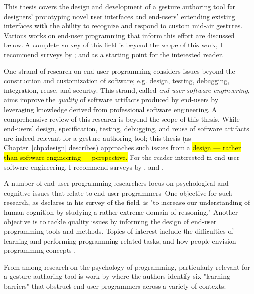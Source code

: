 This thesis covers the design and development of a gesture authoring tool for designers' prototyping novel user interfaces and end-users' extending existing interfaces with the ability to recognize and respond to custom mid-air gestures. Various works on end-user programming that inform this effort are discussed below. A complete survey of this field is beyond the scope of this work; I recommend surveys by \textcite{Paterno:2013}; and \textcite{Myers:2006} as a starting point for the interested reader.

One strand of research on end-user programming considers issues beyond the construction and customization of software; e.g. design, testing, debugging, integration, reuse, and security. This strand, called \emph{end-user software engineering}, aims improve the \emph{quality} of software artifacts produced by end-users by leveraging knowledge derived from professional software engineering. A comprehensive review of this research is beyond the scope of this thesis. While end-users' design, specification, testing, debugging, and reuse of software artifacts are indeed relevant for a gesture authoring tool; this thesis  (as Chapter~\ref{chp:design} describes) approaches such issues from a \hl{design --- rather than software engineering --- perspective.} For the reader interested in end-user software engineering, I recommend surveys by \textcite{Burnett:2004}, and \textcite{Ko:2011}.

A number of end-user programming researchers focus on psychological and cognitive issues that relate to end-user programmers. One objective for such research, as \textcite{Blackwell:2006} declares in his survey of the field, is "to increase our understanding of human cognition by studying a rather extreme domain of reasoning." Another objective is to tackle quality issues by informing the design of end-user programming tools and methods. Topics of interest include the difficulties of learning \parencite{Ko:2004, Pea:1987} and performing \parencite{Lewis:1987} programming-related tasks, and how people envision programming concepts \parencite{Pane:2001}.

From among research on the psychology of programming, particularly relevant for a gesture authoring tool is work by \textcite{Ko:2004} where the authors identify six "learning barriers" that obstruct end-user programmers across a variety of contexts:

\clearpage

